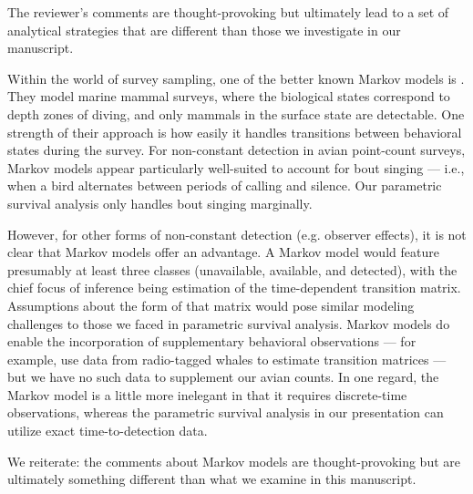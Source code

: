 \documentclass[12pt]{article}
\renewenvironment{quote}  %
              {\list{}{\rightmargin\leftmargin}\normalfont%
               \item\relax}
              {\endlist}
\begin{document}
\begin{quote}
The reviewer's comments are thought-provoking but ultimately lead to a set of analytical strategies that are different than those we investigate in our manuscript.

Within the world of survey sampling, one of the better known Markov models is \citet{Borchers2013}.
They model marine mammal surveys, where the biological states correspond to depth zones of diving, and only mammals in the surface state are detectable.
One strength of their approach is how easily it handles transitions between behavioral states during the survey.
For non-constant detection in avian point-count surveys, Markov models appear particularly well-suited to account for bout singing --- i.e., when a bird alternates between periods of calling and silence.
Our parametric survival analysis only handles bout singing marginally.

However, for other forms of non-constant detection (e.g. observer effects), it is not clear that Markov models offer an advantage.
A Markov model would feature presumably at least three classes (unavailable, available, and detected), with the chief focus of inference being estimation of the time-dependent transition matrix.
Assumptions about the form of that matrix would pose similar modeling challenges to those we faced in parametric survival analysis.
Markov models do enable the incorporation of supplementary behavioral observations --- for example, \citet{Borchers2013} use data from radio-tagged whales to estimate transition matrices --- but we have no such data to supplement our avian counts.
In one regard, the Markov model is a little more inelegant in that it requires discrete-time observations, whereas the parametric survival analysis in our presentation can utilize exact time-to-detection data.

We reiterate: the comments about Markov models are thought-provoking but are ultimately something different than what we examine in this manuscript.
\end{quote}




\end{document}

